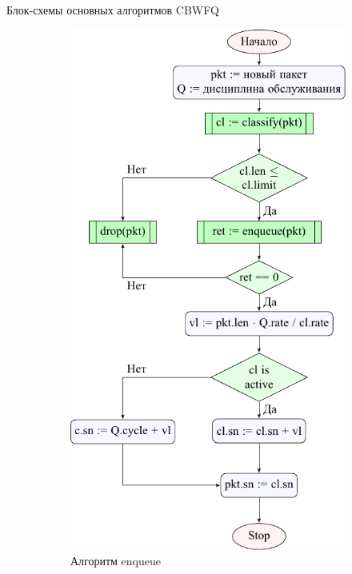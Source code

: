 \documentclass[12pt]{beamer}
\begin{document}
\begin{frame}{Блок-схемы основных алгоритмов CBWFQ}
	\begin{figure}
		\begin{subfigure}[b]{0.4\textwidth}
            \center
            \includegraphics[scale=0.45,frame]{../text/pdfimages/enq_algo.pdf}%
    		\caption*{Алгоритм enqueue}
		\end{subfigure}
~~~~~~~~
		\begin{subfigure}[b]{0.4\textwidth}

\end{subfigure}
\end{figure}
\end{frame}
\end{document}
